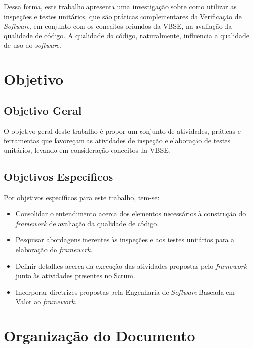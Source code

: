 Dessa forma, este trabalho apresenta uma investigação sobre como utilizar as inspeções e testes unitários, que são práticas complementares da Verificação de \textit{Software}, em conjunto com os conceitos oriundos da VBSE, na avaliação da qualidade de código. A qualidade do código, naturalmente, influencia a qualidade de uso do \textit{software}.

\section{Objetivo}

\subsection{Objetivo Geral}

O objetivo geral deste trabalho é propor um conjunto de atividades, práticas e ferramentas que favoreçam as atividades de inspeção e elaboração de testes unitários, levando em consideração conceitos da VBSE.

\subsection{Objetivos Específicos}

Por objetivos específicos para este trabalho, tem-se:

\begin{itemize}
	\item Consolidar o entendimento acerca dos elementos necessários à construção do \textit{framework} de avaliação da qualidade de código.
	\item Pesquisar abordagens inerentes às inspeções e aos testes unitários para a elaboração do \textit{framework}.
	\item Definir detalhes acerca da execução das atividades propostas pelo \textit{framework} junto às atividades presentes no Scrum.
	\item Incorporar diretrizes propostas pela Engenharia de \textit{Software} Baseada em Valor ao \textit{framework}.
\end{itemize}

\section{Organização do Documento}

